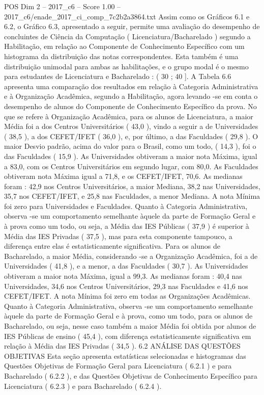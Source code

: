 \begin{textsample}{POS Dim 2 – 2017\_c6 – Score 1.00 – 2017\_c6/enade\_2017\_ci\_comp\_7c2b2a3864.txt}
Assim como os Gráficos 6.1 e 6.2, o Gráfico 6.3, apresentado a seguir, permite uma avaliação do desempenho de concluintes de Ciência da Computação ( Licenciatura/Bacharelado ) segundo a Habilitação, em relação ao Componente de Conhecimento Específico com um histograma da distribuição das notas correspondentes.
Esta também é uma distribuição unimodal para ambas as habilitações, e o grupo modal é o mesmo para estudantes de Licenciatura e Bacharelado : ( 30 ; 40 ].
A Tabela 6.6 apresenta uma comparação dos resultados em relação à Categoria Administrativa e à Organização Acadêmica, segundo a Habilitação, agora levando -se em conta o desempenho de alunos do Componente de Conhecimento Específico da prova.
No que se refere à Organização Acadêmica, para os alunos de Licenciatura, a maior Média foi a dos Centros Universitários ( 43,0 ), vindo a seguir a de Universidades ( 38,5 ), a dos CEFET/IFET ( 36,0 ), e, por último, a das Faculdades ( 29,8 ).
O maior Desvio padrão, acima do valor para o Brasil, como um todo, ( 14,3 ), foi o das Faculdades ( 15,9 ).
As Universidades obtiveram a maior nota Máxima, igual a 83,0, com os Centros Universitários em segundo lugar, com 80,0.
As Faculdades obtiveram nota Máxima igual a 71,8, e os CEFET/IFET, 70,6.
As medianas foram : 42,9 nos Centros Universitários, a maior Mediana, 38,2 nas Universidades, 35,7 nos CEFET/IFET, e 25,8 nas Faculdades, a menor Mediana.
A nota Mínima foi zero para Universidades e Faculdades.
Quanto à Categoria Administrativa, observa -se um comportamento semelhante àquele da parte de Formação Geral e à prova como um todo, ou seja, a Média das IES Públicas ( 37,9 ) é superior à Média das IES Privadas ( 37,5 ), mas para esta componente tampouco, a diferença entre elas é estatisticamente significativa.
Para os alunos de Bacharelado, a maior Média, considerando -se a Organização Acadêmica, foi a de Universidades ( 41,8 ), e a menor, a das Faculdades ( 30,7 ).
As Universidades obtiveram a maior nota Máxima, igual a 99,3.
As medianas foram : 40,4 nas Universidades, 34,6 nos Centros Universitários, 29,3 nas Faculdades e 41,6 nos CEFET/IFET.
A nota Mínima foi zero em todas as Organizações Acadêmicas.
Quanto à Categoria Administrativa, observa -se um comportamento semelhante àquele da parte de Formação Geral e à prova, como um todo, para os alunos de Bacharelado, ou seja, nesse caso também a maior Média foi obtida por alunos de IES Públicas de ensino ( 45,4 ), com diferença estatisticamente significativa em relação à Média das IES Privadas ( 34,5 ). 6.2 ANÁLISE DAS QUESTÕES OBJETIVAS Esta seção apresenta estatísticas selecionadas e histogramas das Questões Objetivas de Formação Geral para Licenciatura ( 6.2.1 ) e para Bacharelado ( 6.2.2 ), e das Questões Objetivas de Conhecimento Específico para Licenciatura ( 6.2.3 ) e para Bacharelado ( 6.2.4 ).

\end{textsample}
